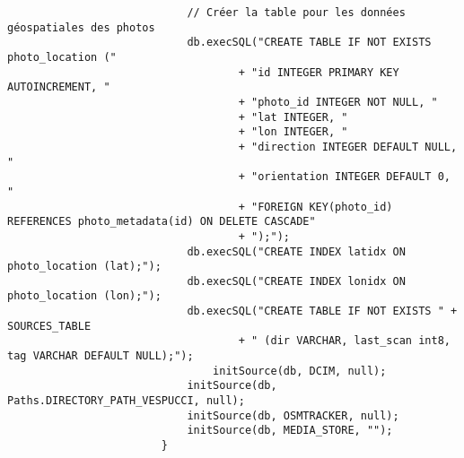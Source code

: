\begin{enumerate}
\begin{itemize}
\begin{verbatim}
                            // Créer la table pour les données géospatiales des photos
                            db.execSQL("CREATE TABLE IF NOT EXISTS photo_location ("
                                    + "id INTEGER PRIMARY KEY AUTOINCREMENT, "
                                    + "photo_id INTEGER NOT NULL, "
                                    + "lat INTEGER, "
                                    + "lon INTEGER, "
                                    + "direction INTEGER DEFAULT NULL, "
                                    + "orientation INTEGER DEFAULT 0, "
                                    + "FOREIGN KEY(photo_id) REFERENCES photo_metadata(id) ON DELETE CASCADE"
                                    + ");");
                            db.execSQL("CREATE INDEX latidx ON photo_location (lat);");
                            db.execSQL("CREATE INDEX lonidx ON photo_location (lon);");
                            db.execSQL("CREATE TABLE IF NOT EXISTS " + SOURCES_TABLE
                                    + " (dir VARCHAR, last_scan int8, tag VARCHAR DEFAULT NULL);");
                                initSource(db, DCIM, null);
                            initSource(db, Paths.DIRECTORY_PATH_VESPUCCI, null);
                            initSource(db, OSMTRACKER, null);
                            initSource(db, MEDIA_STORE, "");
                        }
                    \end{verbatim}
          \end{itemize}
\end{enumerate}

